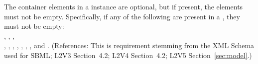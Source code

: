 The  container elements in a \Model instance are optional,
but if present, the elements must not be empty.  Specifically, if
any of the following are present in a \Model, they must not be empty:\\
,
,
,
\\ ,
, 
,
,
,
,
,
 and .  (References:
This is requirement stemming from the XML Schema used for SBML;
L2V3 Section~4.2; L2V4 Section~4.2; L2V5 Section~\ref{sec:model}.)
